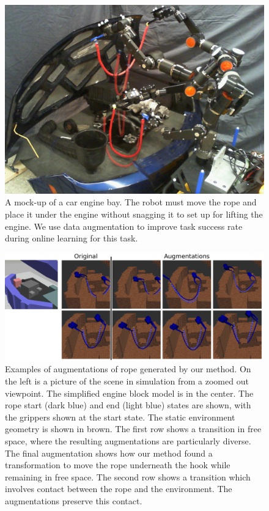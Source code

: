 \begin{figure}
    \centering
    \includegraphics[width=0.9\linewidth]{Chap3/images/title_figure.png}
    \caption{A mock-up of a car engine bay. The robot must move the rope and place it under the engine without snagging it to set up for lifting the engine. We use data augmentation to improve task success rate during online learning for this task.}
    \label{RSS:fig:real_robot_setup}
\end{figure}

\begin{figure}
    \centering
    \includegraphics[width=1\linewidth]{Chap3/images/rope_aug_examples.png}
    \caption{Examples of augmentations of rope generated by our method. On the left is a picture of the scene in simulation from a zoomed out viewpoint. The simplified engine block model is in the center. The rope start (dark blue) and end (light blue) states are shown, with the grippers shown at the start state. The static environment geometry is shown in brown. The first row shows a transition in free space, where the resulting augmentations are particularly diverse. The final augmentation shows how our method found a transformation to move the rope underneath the hook while remaining in free space. The second row shows a transition which involves contact between the rope and the environment. The augmentations preserve this contact.}
    \label{RSS:fig:rope_aug_examples}
\end{figure}


